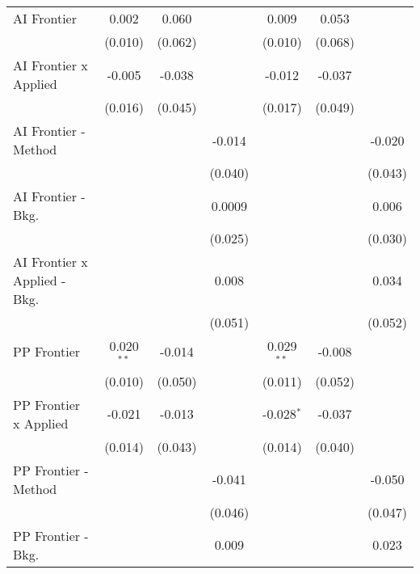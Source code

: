 \begin{tabular}{lcccccc}
   AI Frontier                    & 0.002         & 0.060   &              & 0.009         & 0.053   &   \\   
                                  & (0.010)       & (0.062) &              & (0.010)       & (0.068) &   \\   
   AI Frontier x Applied          & -0.005        & -0.038  &              & -0.012        & -0.037  &   \\   
                                  & (0.016)       & (0.045) &              & (0.017)       & (0.049) &   \\   
   AI Frontier - Method           &               &         & -0.014       &               &         & -0.020\\   
                                  &               &         & (0.040)      &               &         & (0.043)\\   
   AI Frontier - Bkg.             &               &         & 0.0009       &               &         & 0.006\\   
                                  &               &         & (0.025)      &               &         & (0.030)\\   
   AI Frontier x Applied - Bkg.   &               &         & 0.008        &               &         & 0.034\\   
                                  &               &         & (0.051)      &               &         & (0.052)\\   
   PP Frontier                    & 0.020$^{**}$  & -0.014  &              & 0.029$^{**}$  & -0.008  &   \\   
                                  & (0.010)       & (0.050) &              & (0.011)       & (0.052) &   \\   
   PP Frontier x Applied          & -0.021        & -0.013  &              & -0.028$^{*}$  & -0.037  &   \\   
                                  & (0.014)       & (0.043) &              & (0.014)       & (0.040) &   \\   
   PP Frontier - Method           &               &         & -0.041       &               &         & -0.050\\   
                                  &               &         & (0.046)      &               &         & (0.047)\\   
   PP Frontier - Bkg.             &               &         & 0.009        &               &         & 0.023\\   

\end{tabular}
